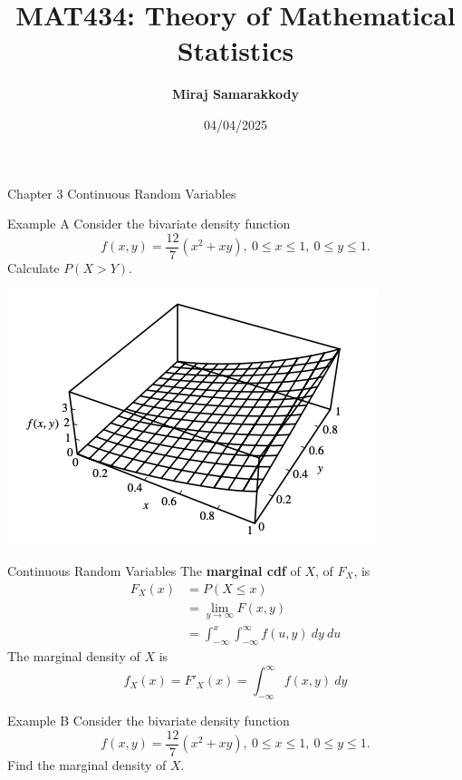 \documentclass{beamer}
\title{MAT434: Theory of Mathematical Statistics}
\author{\textbf{Miraj Samarakkody}}
\institute{Tougaloo College}
\date{04/04/2025}
\begin{document}
\begin{frame}
    \titlepage
\end{frame}



\begin{frame}{Chapter 3}
    \Huge{Continuous Random Variables}
\end{frame}





\begin{frame}{Example A}
    Consider the bivariate density function \[f(x,y)=\dfrac{12}{7}(x^2+xy),~0 \leq x \leq 1,~0\leq y \leq 1.\] Calculate \(P(X>Y)\). 

    \includegraphics[scale=0.5]{Figures/fig_7.png}


\end{frame}

\begin{frame}{Continuous Random Variables}
    The \textbf{marginal cdf} of \(X\), of \(F_X\), is \begin{align*}
        F_X(x) & = P(X \leq x)\\
        & = \lim_{y \to \infty}F(x,y)\\
        & = \int_{-\infty}^{x} \int_{-\infty}^{\infty} f(u,y)~dy~du
    \end{align*}
    The marginal density of \(X\) is \[f_X(x)=F'_X(x)= \int_{-\infty}^{\infty}f(x,y)~dy\]
\end{frame}


\begin{frame}{Example B}
    Consider the bivariate density function \[f(x,y)=\dfrac{12}{7}(x^2+xy),~0 \leq x \leq 1,~0\leq y \leq 1.\] Find the marginal density of \(X\). 


\end{frame}
\end{document}
